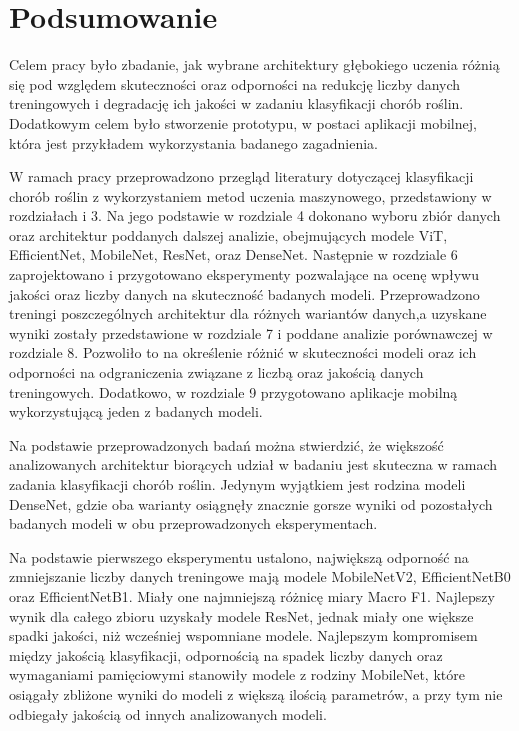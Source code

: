 \newpage
\section{Podsumowanie}
Celem pracy było zbadanie, jak wybrane architektury głębokiego uczenia różnią się pod względem skuteczności oraz odporności na redukcję liczby danych treningowych i degradację ich jakości w zadaniu klasyfikacji chorób roślin. Dodatkowym celem było stworzenie prototypu, w postaci aplikacji mobilnej, która jest przykładem wykorzystania badanego zagadnienia.

W ramach pracy przeprowadzono przegląd literatury dotyczącej klasyfikacji chorób roślin z wykorzystaniem metod uczenia maszynowego, przedstawiony w rozdziałach  i 3. Na jego podstawie w rozdziale 4 dokonano wyboru zbiór danych oraz architektur poddanych dalszej analizie, obejmujących modele ViT, EfficientNet, MobileNet,  ResNet, oraz DenseNet. Następnie w rozdziale 6 zaprojektowano i przygotowano eksperymenty pozwalające na ocenę wpływu jakości oraz liczby danych na skuteczność badanych modeli. Przeprowadzono treningi poszczególnych architektur dla różnych wariantów danych,\newline a uzyskane wyniki zostały przedstawione w rozdziale 7 i poddane analizie porównawczej w rozdziale 8. Pozwoliło to na określenie różnić w skuteczności modeli oraz ich odporności na odgraniczenia związane z liczbą oraz jakością danych treningowych. Dodatkowo, \newline w rozdziale 9 przygotowano aplikacje mobilną wykorzystującą jeden z badanych modeli. 

 Na podstawie przeprowadzonych badań można stwierdzić, że większość analizowanych architektur biorących udział w badaniu jest skuteczna w ramach zadania klasyfikacji chorób roślin. Jedynym wyjątkiem jest  rodzina modeli DenseNet, gdzie oba warianty osiągnęły znacznie gorsze wyniki od pozostałych badanych modeli w obu przeprowadzonych eksperymentach. 
 
 Na podstawie pierwszego eksperymentu ustalono, największą odporność na zmniejszanie liczby danych treningowe mają modele MobileNetV2, EfficientNetB0 oraz EfficientNetB1. Miały one najmniejszą różnicę miary Macro F1. Najlepszy wynik dla całego zbioru uzyskały modele ResNet, jednak miały one większe spadki jakości, niż wcześniej wspomniane modele. Najlepszym kompromisem między jakością klasyfikacji, odpornością na spadek liczby danych oraz wymaganiami pamięciowymi stanowiły modele z rodziny MobileNet, które osiągały zbliżone wyniki do modeli z większą ilością parametrów, a przy tym nie odbiegały jakością od innych analizowanych modeli.
 
